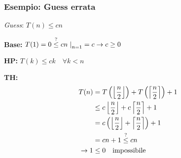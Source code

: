 \subsubsection{Esempio: Guess errata}
\textit{Guess}: $T(n) \leq cn$
\begin{description}
    \item{\textbf{Base:}} $T(1) = 0 \overset{?}{\leq} cn \left. \right|_{n=1} = c \rightarrow c \geq 0 $ 
    \item{\textbf{HP:}} $T(k) \leq ck \quad \forall k<n $
    \item{\textbf{TH:}} 
        \begin{equation*}
            \begin{split}
                T(n) &=
                T \left( \left\lfloor \frac{n}{2} \right\rfloor \right) 
                + T \left( \left\lceil \frac{n}{2} \right\rceil \right) + 1 \\
                &\leq c \left\lfloor \frac{n}{2} \right\rfloor + c \left\lceil \frac{n}{2} \right\rceil + 1 \\
                &= c \left( \left\lfloor \frac{n}{2} \right\rfloor + \left\lceil \frac{n}{2} \right\rceil \right) + 1 \\
                &= cn + 1 \overset{?}{\leq} cn \\
                \rightarrow  1 &\leq 0 \quad \text{impossibile}
            \end{split}
        \end{equation*}
\end{description}


